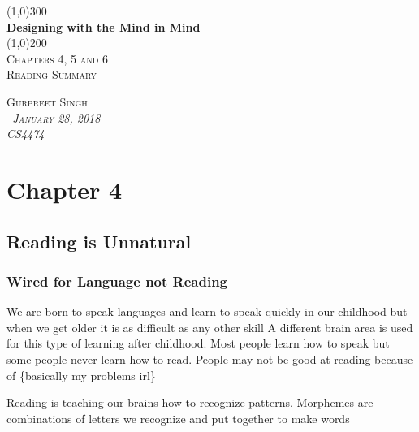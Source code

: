\documentclass[11pt,]{article}
\begin{document}
\begin{titlepage}
    \begin{center}
    \line(1,0){300} \\ 
    [0.25in]
    \huge{\bfseries Designing with the Mind in Mind} \\
    [2mm]
    \line(1,0){200} \\
    [1.5cm] 
    \textsc{\Large Chapters 4, 5 and 6} \\
    [0.75cm]
    \textsc{\Large Reading Summary} \\
    [12cm]
    \end{center}
    
    \begin{flushright}
    \textsc{\Large{Gurpreet Singh \\}\normalsize\emph{\ January 28, 2018 \\}\normalsize\emph{CS4474 \\} }
    
    \end{flushright}

\end{titlepage}

\newpage
\shipout\null

\hypertarget{chapter-4}{%
\section{Chapter 4}\label{chapter-4}}

\hypertarget{reading-is-unnatural}{%
\subsection{Reading is Unnatural}\label{reading-is-unnatural}}

\hypertarget{wired-for-language-not-reading}{%
\subsubsection{Wired for Language not
Reading}\label{wired-for-language-not-reading}}

We are born to speak languages and learn to speak quickly in our
childhood but when we get older it is as difficult as any other skill A
different brain area is used for this type of learning after childhood.
Most people learn how to speak but some people never learn how to read.
People may not be good at reading because of \{basically my problems
irl\}

Reading is teaching our brains how to recognize patterns. Morphemes are
combinations of letters we recognize and put together to make words
\end{document}
